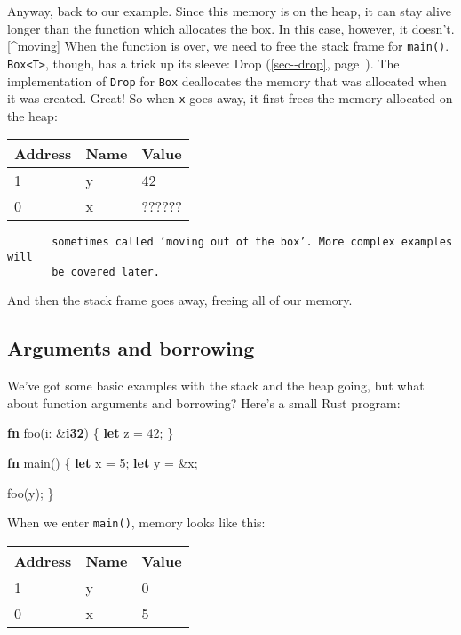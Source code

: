 \documentclass[a4paper,]{book}
\renewcommand*{\hyperref}[2][\ar]{%
  \def\ar{#2}%
  #2 (\autoref{#1}, page~\pageref{#1})}
\newenvironment{Shaded}{\begin{snugshade}}{\end{snugshade}}
\newcommand{\KeywordTok}[1]{\textcolor[rgb]{0.13,0.29,0.53}{\textbf{{#1}}}}
\newcommand{\DecValTok}[1]{\textcolor[rgb]{0.00,0.00,0.81}{{#1}}}
\newcommand{\NormalTok}[1]{{#1}}
\begin{document}
Anyway, back to our example. Since this memory is on the heap, it can
stay alive longer than the function which allocates the box. In this
case, however, it doesn't.{[}\^{}moving{]} When the function is over, we
need to free the stack frame for \texttt{main()}.
\texttt{Box\textless{}T\textgreater{}}, though, has a trick up its
sleeve: \hyperref[sec--drop]{Drop}. The implementation of \texttt{Drop}
for \texttt{Box} deallocates the memory that was allocated when it was
created. Great! So when \texttt{x} goes away, it first frees the memory
allocated on the heap:

\begin{longtable}[c]{@{}lll@{}}
\toprule
Address & Name & Value\tabularnewline
\midrule
\endhead
1 & y & 42\tabularnewline
0 & x & ??????\tabularnewline
\bottomrule
\end{longtable}

\begin{verbatim}
       sometimes called ‘moving out of the box’. More complex examples will
       be covered later.
\end{verbatim}

And then the stack frame goes away, freeing all of our memory.

\subsection{Arguments and borrowing}\label{arguments-and-borrowing}

We've got some basic examples with the stack and the heap going, but
what about function arguments and borrowing? Here's a small Rust
program:

\begin{Shaded}
\begin{Highlighting}[]
\KeywordTok{fn} \NormalTok{foo(i: &}\KeywordTok{i32}\NormalTok{) \{}
    \KeywordTok{let} \NormalTok{z = }\DecValTok{42}\NormalTok{;}
\NormalTok{\}}

\KeywordTok{fn} \NormalTok{main() \{}
    \KeywordTok{let} \NormalTok{x = }\DecValTok{5}\NormalTok{;}
    \KeywordTok{let} \NormalTok{y = &x;}

    \NormalTok{foo(y);}
\NormalTok{\}}
\end{Highlighting}
\end{Shaded}

When we enter \texttt{main()}, memory looks like this:

\begin{longtable}[c]{@{}lll@{}}
\toprule
Address & Name & Value\tabularnewline
\midrule
\endhead
1 & y & 0\tabularnewline
0 & x & 5\tabularnewline
\bottomrule
\end{longtable}
\end{document}
